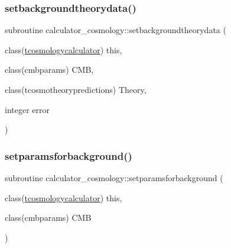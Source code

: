 \subsubsection{\texorpdfstring{setbackgroundtheorydata()}{setbackgroundtheorydata()}}
{\footnotesize\ttfamily subroutine calculator\+\_\+cosmology\+::setbackgroundtheorydata (\begin{DoxyParamCaption}\item[{class(\mbox{\hyperlink{structcalculator__cosmology_1_1tcosmologycalculator}{tcosmologycalculator}})}]{this,  }\item[{class(cmbparams)}]{C\+MB,  }\item[{class(tcosmotheorypredictions)}]{Theory,  }\item[{integer}]{error }\end{DoxyParamCaption})\hspace{0.3cm}{\ttfamily [private]}}

\mbox{\label{namespacecalculator__cosmology_aabddd5a422eef22f8d13c1df292cc749}} 
\subsubsection{\texorpdfstring{setparamsforbackground()}{setparamsforbackground()}}
{\footnotesize\ttfamily subroutine calculator\+\_\+cosmology\+::setparamsforbackground (\begin{DoxyParamCaption}\item[{class(\mbox{\hyperlink{structcalculator__cosmology_1_1tcosmologycalculator}{tcosmologycalculator}})}]{this,  }\item[{class(cmbparams)}]{C\+MB }\end{DoxyParamCaption})\hspace{0.3cm}{\ttfamily [private]}}

\mbox{\label{namespacecalculator__cosmology_a8df979f2a96e1c2b9624e105619464c2}} 
